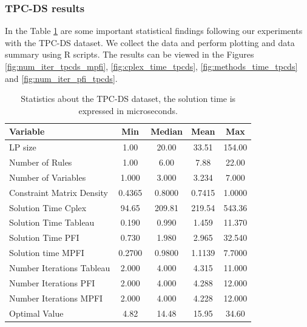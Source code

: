 \subsubsection{TPC-DS results}
In the Table \ref{stat_tpcds} are some important statistical findings following our
experiments with the TPC-DS dataset.
We collect the data and perform plotting and data summary using R scripts. The results can be
viewed in the Figures \ref{fig:num_iter_tpcds_mpfi}, \ref{fig:cplex_time_tpcds}, \ref{fig:methods_time_tpcds} and \ref{fig:num_iter_pfi_tpcds}.
\begin{table}[h]
    \centering
    \caption{Statistics about the TPC-DS dataset, the solution time is expressed in microseconds.}
    \begin{tabular}{lcccc}
        \toprule
        Variable                  & Min    & Median & Mean   & Max    \\
        \midrule
        LP size                   & 1.00   & 20.00  & 33.51  & 154.00 \\
        Number of Rules           & 1.00   & 6.00   & 7.88   & 22.00  \\
        Number of Variables       & 1.000  & 3.000  & 3.234  & 7.000  \\
        Constraint Matrix Density & 0.4365 & 0.8000 & 0.7415 & 1.0000 \\
        Solution Time Cplex       & 94.65  & 209.81 & 219.54 & 543.36 \\
        Solution Time Tableau     & 0.190  & 0.990  & 1.459  & 11.370 \\
        Solution Time PFI         & 0.730  & 1.980  & 2.965  & 32.540 \\
        Solution time MPFI        & 0.2700 & 0.9800 & 1.1139 & 7.7000 \\
        Number Iterations Tableau & 2.000  & 4.000  & 4.315  & 11.000 \\
        Number Iterations PFI     & 2.000  & 4.000  & 4.288  & 12.000 \\
        Number Iterations MPFI    & 2.000  & 4.000  & 4.228  & 12.000 \\
        Optimal Value             & 4.82   & 14.48  & 15.95  & 34.60  \\
        \bottomrule
    \end{tabular}
    \label{stat_tpcds}
\end{table}


